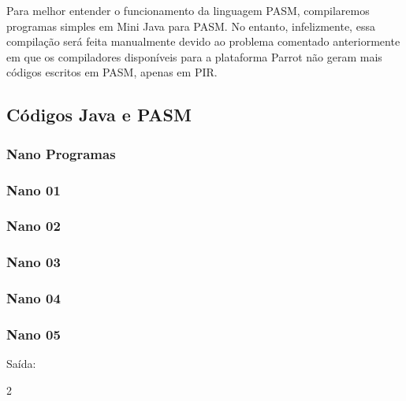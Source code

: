 \documentclass[12pt,a4paper,twoside]{report}
\begin{document}
Para melhor entender o funcionamento da linguagem PASM, compilaremos programas simples em Mini Java para PASM. No entanto, infelizmente, essa compilação será feita manualmente devido ao problema comentado anteriormente em que os compiladores disponíveis para a plataforma Parrot não geram mais códigos escritos em PASM, apenas em PIR.


\subsection{Códigos Java e PASM}

\subsubsection{Nano Programas}
\subsubsection{Nano 01}



\subsubsection{Nano 02}



\subsubsection{Nano 03}



\subsubsection{Nano 04}



\subsubsection{Nano 05}


Saída:
\begin{terminal}
2
\end{terminal}
\end{document}
